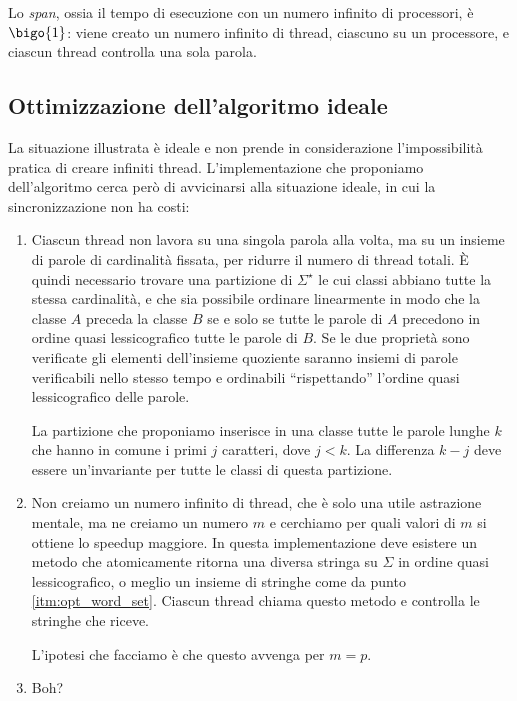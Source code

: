 \documentclass[]{myarticle}
\begin{document}
Lo \emph{span}, ossia il tempo di esecuzione con un numero infinito di processori, \`e $\bigo{1}$: viene creato un numero infinito di thread, ciascuno su un processore, e ciascun thread controlla una sola parola.

\subsection{Ottimizzazione dell'algoritmo ideale}

La situazione illustrata \`e ideale e non prende in considerazione l'impossibilit\`a pratica di creare infiniti thread.
L'implementazione che proponiamo dell'algoritmo cerca per\`o di avvicinarsi alla situazione ideale, in cui la sincronizzazione non ha costi:
\begin{enumerate}
	\item \label{itm:opt_word_set} Ciascun thread non lavora su una singola parola alla volta, ma su un insieme di parole di cardinalit\`a fissata, per ridurre il numero di thread totali.
		\`E quindi necessario trovare una partizione di $\Sigma^{\star}$ le cui classi abbiano tutte la stessa cardinalit\`a, e che sia possibile ordinare linearmente in modo che la classe $A$  preceda la classe $B$  se e solo se tutte le parole di $A$ precedono in ordine quasi lessicografico tutte le parole di $B$.
		Se le due propriet\`a sono verificate gli elementi dell'insieme quoziente saranno insiemi di parole verificabili nello stesso tempo e ordinabili ``rispettando'' l'ordine quasi lessicografico delle parole.

		La partizione che proponiamo inserisce in una classe tutte le parole lunghe $k$ che hanno in comune i primi $j$ caratteri, dove $j < k$.
		La differenza $k - j$ deve essere un'invariante per tutte le classi di questa partizione.
	\item Non creiamo un numero infinito di thread, che \`e solo una utile astrazione mentale, ma ne creiamo un numero $m$ e cerchiamo per quali valori di $m$ si ottiene lo speedup maggiore.
		In questa implementazione deve esistere un metodo che atomicamente ritorna una diversa stringa su $\Sigma$ in ordine quasi lessicografico, o meglio un insieme di stringhe come da punto \ref{itm:opt_word_set}.
		Ciascun thread chiama questo metodo e controlla le stringhe che riceve.

		L'ipotesi che facciamo \`e che questo avvenga per $m = p$.
	\item Boh?
\end{enumerate}
\end{document}

